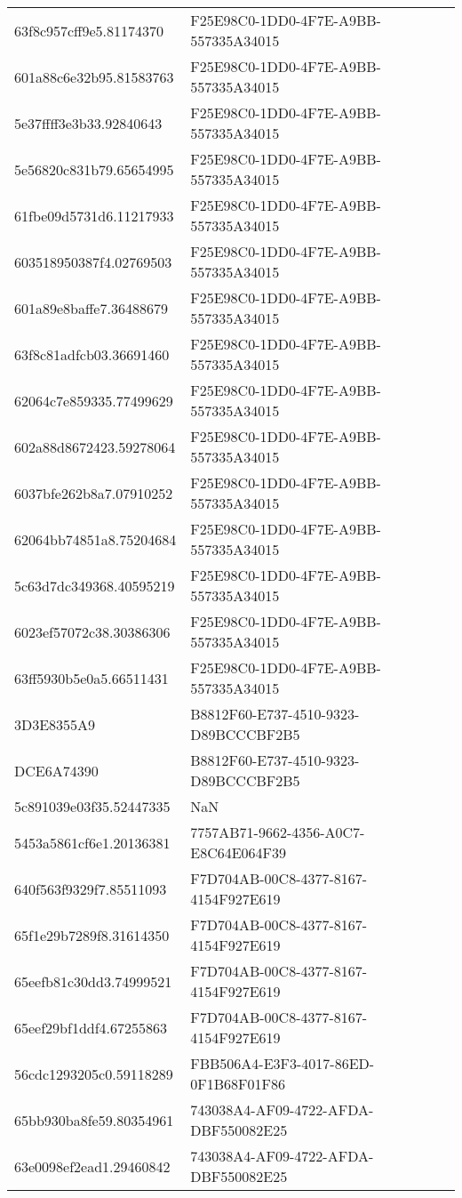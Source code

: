 \begin{tabular}{ll}
63f8c957cff9e5.81174370 & F25E98C0-1DD0-4F7E-A9BB-557335A34015 \\
601a88c6e32b95.81583763 & F25E98C0-1DD0-4F7E-A9BB-557335A34015 \\
5e37ffff3e3b33.92840643 & F25E98C0-1DD0-4F7E-A9BB-557335A34015 \\
5e56820c831b79.65654995 & F25E98C0-1DD0-4F7E-A9BB-557335A34015 \\
61fbe09d5731d6.11217933 & F25E98C0-1DD0-4F7E-A9BB-557335A34015 \\
603518950387f4.02769503 & F25E98C0-1DD0-4F7E-A9BB-557335A34015 \\
601a89e8baffe7.36488679 & F25E98C0-1DD0-4F7E-A9BB-557335A34015 \\
63f8c81adfcb03.36691460 & F25E98C0-1DD0-4F7E-A9BB-557335A34015 \\
62064c7e859335.77499629 & F25E98C0-1DD0-4F7E-A9BB-557335A34015 \\
602a88d8672423.59278064 & F25E98C0-1DD0-4F7E-A9BB-557335A34015 \\
6037bfe262b8a7.07910252 & F25E98C0-1DD0-4F7E-A9BB-557335A34015 \\
62064bb74851a8.75204684 & F25E98C0-1DD0-4F7E-A9BB-557335A34015 \\
5c63d7dc349368.40595219 & F25E98C0-1DD0-4F7E-A9BB-557335A34015 \\
6023ef57072c38.30386306 & F25E98C0-1DD0-4F7E-A9BB-557335A34015 \\
63ff5930b5e0a5.66511431 & F25E98C0-1DD0-4F7E-A9BB-557335A34015 \\
3D3E8355A9 & B8812F60-E737-4510-9323-D89BCCCBF2B5 \\
DCE6A74390 & B8812F60-E737-4510-9323-D89BCCCBF2B5 \\
5c891039e03f35.52447335 & NaN \\
5453a5861cf6e1.20136381 & 7757AB71-9662-4356-A0C7-E8C64E064F39 \\
640f563f9329f7.85511093 & F7D704AB-00C8-4377-8167-4154F927E619 \\
65f1e29b7289f8.31614350 & F7D704AB-00C8-4377-8167-4154F927E619 \\
65eefb81c30dd3.74999521 & F7D704AB-00C8-4377-8167-4154F927E619 \\
65eef29bf1ddf4.67255863 & F7D704AB-00C8-4377-8167-4154F927E619 \\
56cdc1293205c0.59118289 & FBB506A4-E3F3-4017-86ED-0F1B68F01F86 \\
65bb930ba8fe59.80354961 & 743038A4-AF09-4722-AFDA-DBF550082E25 \\
63e0098ef2ead1.29460842 & 743038A4-AF09-4722-AFDA-DBF550082E25 \\

\end{tabular}
